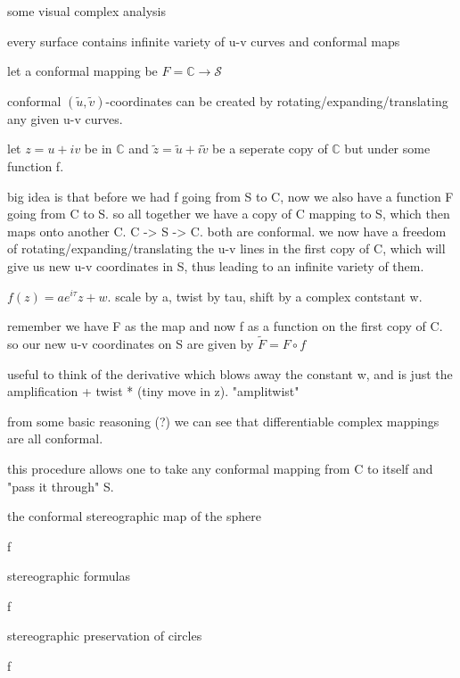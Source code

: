 \documentclass{article}
\newenvironment{andrew_section}[1]
    {
    \section{#1}
    \begin{itemize}
    }
    {
    \end{itemize}
    }
\begin{document}
\begin{andrew_section}{some visual complex analysis}
    \item 
        every surface contains infinite variety of u-v curves and conformal maps 
    \item 
        let a conformal mapping be $F = \mathbb{C} \rightarrow \mathcal{S}$
    \item 
        conformal $(\tilde{u}, \tilde{v})$-coordinates can be created by
        rotating/expanding/translating any given u-v curves.
    \item 
        let $z = u + iv$ be in $\mathbb{C}$ and 
        $\tilde{z} = \tilde{u} + i \tilde{v}$ be a seperate copy of $\mathbb{C}$
        but under some function f.
    \item 
        big idea is that before we had f going from S to C, now we also have a
        function F going from C to S.  so all together we have a copy of C
        mapping to S, which then maps onto another C.  C -> S -> C.
        both are conformal.  we now have a freedom of rotating/expanding/translating
        the u-v lines in the first copy of C, which will give us new u-v coordinates
        in S, thus leading to an infinite variety of them.
    \item 
        $f(z) = a e ^ {i \tau} z + w$. scale by a, twist by tau, shift by a complex
        contstant w.
    \item 
        remember we have F as the map and now f as a function on the first copy
        of C.  so our new u-v coordinates on S are given by $\tilde{F} = F \circ f$
    \item  
        useful to think of the derivative which blows away the constant w, and is just the 
        amplification + twist * (tiny move in z).  "amplitwist"
    \item 
        from some basic reasoning (?) we can see that differentiable complex mappings
        are all conformal.
    \item 
        this procedure allows one to take any conformal mapping from C to itself
        and "pass it through" S.
\end{andrew_section}

\begin{andrew_section}{the conformal stereographic map of the sphere}
    \item 
        f
\end{andrew_section}

\begin{andrew_section}{stereographic formulas}
    \item 
        f
\end{andrew_section}

\begin{andrew_section}{stereographic preservation of circles}
    \item 
        f
\end{andrew_section}
\end{document}
